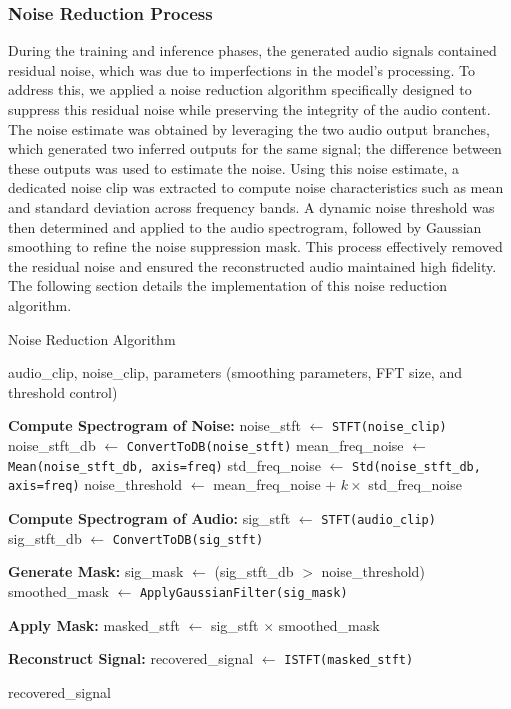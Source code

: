 \documentclass{ioereport}
\begin{document}
    \subsubsection{Noise Reduction Process}
    During the training and inference phases, the generated audio signals contained residual noise, which was due to imperfections in the model's processing. To address this, we applied a noise reduction algorithm specifically designed to suppress this residual noise while preserving the integrity of the audio content. The noise estimate was obtained by leveraging the two audio output branches, which generated two inferred outputs for the same signal; the difference between these outputs was used to estimate the noise. Using this noise estimate, a dedicated noise clip was extracted to compute noise characteristics such as mean and standard deviation across frequency bands. A dynamic noise threshold was then determined and applied to the audio spectrogram, followed by Gaussian smoothing to refine the noise suppression mask. This process effectively removed the residual noise and ensured the reconstructed audio maintained high fidelity.
    The following section details the implementation of this noise reduction algorithm.
    \begin{algorithm}[H]
        \caption{Noise Reduction Algorithm}
        \label{alg:noise_reduction}
        \begin{algorithmic}[1]
        \REQUIRE audio\_clip, noise\_clip, parameters (smoothing parameters, FFT size, and threshold control)
        
        \STATE \textbf{Compute Spectrogram of Noise:}
        \STATE noise\_stft $\gets$ \texttt{STFT(noise\_clip)}
        \STATE noise\_stft\_db $\gets$ \texttt{ConvertToDB(noise\_stft)}
        \STATE mean\_freq\_noise $\gets$ \texttt{Mean(noise\_stft\_db, axis=freq)}
        \STATE std\_freq\_noise $\gets$ \texttt{Std(noise\_stft\_db, axis=freq)}
        \STATE noise\_threshold $\gets$ mean\_freq\_noise + $k \times$ std\_freq\_noise
        
        \STATE \textbf{Compute Spectrogram of Audio:}
        \STATE sig\_stft $\gets$ \texttt{STFT(audio\_clip)}
        \STATE sig\_stft\_db $\gets$ \texttt{ConvertToDB(sig\_stft)}
        
        \STATE \textbf{Generate Mask:}
        \STATE sig\_mask $\gets$ (sig\_stft\_db $>$ noise\_threshold)
        \STATE smoothed\_mask $\gets$ \texttt{ApplyGaussianFilter(sig\_mask)}
        
        \STATE \textbf{Apply Mask:}
        \STATE masked\_stft $\gets$ sig\_stft $\times$ smoothed\_mask
        
        \STATE \textbf{Reconstruct Signal:}
        \STATE recovered\_signal $\gets$ \texttt{ISTFT(masked\_stft)}
        
        \RETURN recovered\_signal
        \end{algorithmic}
    \end{algorithm}
    
\end{document}
